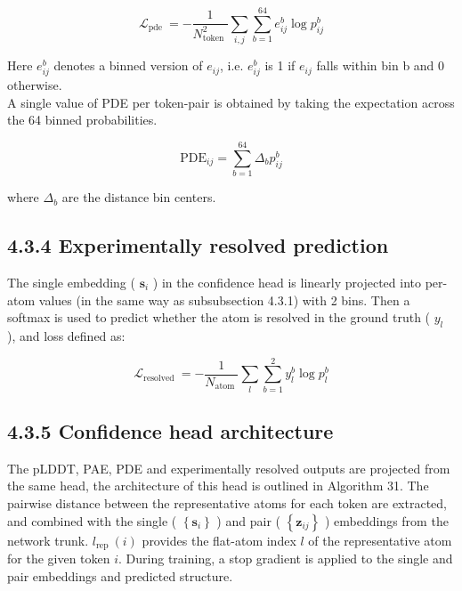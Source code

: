 \documentclass[10pt]{article}
\begin{document}
\begin{equation*}
\mathcal{L}_{\text {pde }}=-\frac{1}{N_{\text {token }}^{2}} \sum_{i, j} \sum_{b=1}^{64} e_{i j}^{b} \log p_{i j}^{b} \tag{12}
\end{equation*}


Here $e_{i j}^{b}$ denotes a binned version of $e_{i j}$, i.e. $e_{i j}^{b}$ is 1 if $e_{i j}$ falls within bin b and 0 otherwise.\\
A single value of PDE per token-pair is obtained by taking the expectation across the 64 binned probabilities.


\begin{equation*}
\mathrm{PDE}_{i j}=\sum_{b=1}^{64} \Delta_{b} p_{i j}^{b} \tag{13}
\end{equation*}


where $\Delta_{b}$ are the distance bin centers.

\subsection*{4.3.4 Experimentally resolved prediction}
The single embedding ( $\mathbf{s}_{i}$ ) in the confidence head is linearly projected into per-atom values (in the same way as subsubsection 4.3.1) with 2 bins. Then a softmax is used to predict whether the atom is resolved in the ground truth ( $y_{l}$ ), and loss defined as:


\begin{equation*}
\mathcal{L}_{\text {resolved }}=-\frac{1}{N_{\text {atom }}} \sum_{l} \sum_{b=1}^{2} y_{l}^{b} \log p_{l}^{b} \tag{14}
\end{equation*}


\subsection*{4.3.5 Confidence head architecture}
The pLDDT, PAE, PDE and experimentally resolved outputs are projected from the same head, the architecture of this head is outlined in Algorithm 31. The pairwise distance between the representative atoms for each token are extracted, and combined with the single ( $\left\{\mathbf{s}_{i}\right\}$ ) and pair ( $\left\{\mathbf{z}_{i j}\right\}$ ) embeddings from the network trunk. $l_{\text {rep }}(i)$ provides the flat-atom index $l$ of the representative atom for the given token $i$. During training, a stop gradient is applied to the single and pair embeddings and predicted structure.
\end{document}
